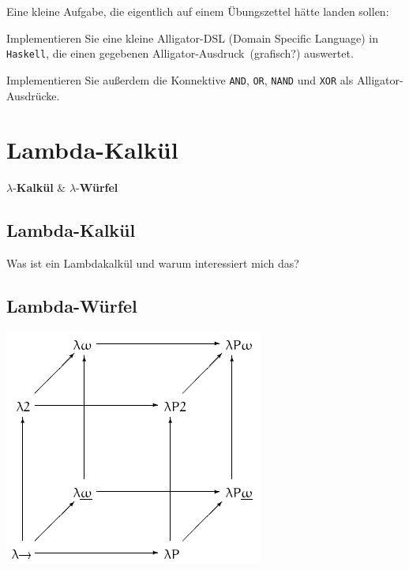 \documentclass{beamer}
\begin{document}
\begin{frame}

Eine kleine Aufgabe, die eigentlich auf einem Übungszettel hätte landen sollen:\pause\bigskip

Implementieren Sie eine kleine Alligator-DSL (Domain Specific Language) in \texttt{Haskell}, die einen gegebenen \glqq Alligator-Ausdruck\grqq\ (grafisch?) auswertet.\bigskip

Implementieren Sie außerdem die Konnektive \texttt{AND}, \texttt{OR}, \texttt{NAND} und \texttt{XOR} als Alligator-Ausdrücke. 

\end{frame}

\section*{Lambda-Kalkül}

\begin{frame}

\begin{center}
\Large $\lambda$-\textbf{Kalkül} \& $\lambda$-\textbf{Würfel} \normalsize
\end{center}

\end{frame}

\subsection*{Lambda-Kalkül}

\begin{frame}
Was ist ein Lambdakalkül und warum interessiert mich das?
\end{frame}

\subsection*{Lambda-Würfel}

\begin{frame}
\includegraphics[scale=0.5]{Lambda_cube.png} 
\end{frame}
\end{document}
